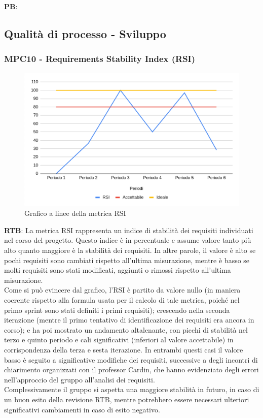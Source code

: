 \documentclass[10pt]{article}
\begin{document}
\begin{justify}
\noindent
\textbf{PB}:


\subsection{Qualità di processo - Sviluppo}
\subsubsection{MPC10 - Requirements Stability Index (RSI)}%

\begin{figure}[H]
  \centering
  \includegraphics[width=0.9\linewidth]{RSI.png}
  \caption{Grafico a linee della metrica RSI}
  \label{fig:RSIchart}
\end{figure}

\textbf{RTB}: La metrica RSI rappresenta un indice di stabilità dei requisiti individuati nel corso del progetto. Questo indice è in percentuale e assume valore tanto più alto 
quanto maggiore è la stabilità dei requisiti. In altre parole, il valore è alto se pochi requisiti sono cambiati rispetto all'ultima misurazione, mentre è basso se molti requisiti sono
stati modificati, aggiunti o rimossi rispetto all'ultima misurazione.\\
Come si può evincere dal grafico, l'RSI è partito da valore nullo (in maniera coerente rispetto alla formula usata per il calcolo di tale metrica, poiché nel primo sprint 
sono stati definiti i primi requisiti); crescendo nella seconda iterazione (mentre il primo tentativo di identificazione dei requisiti era ancora in corso); e ha poi mostrato 
un andamento altalenante, con picchi di stabilità nel terzo e quinto periodo e cali significativi (inferiori al valore accettabile) in corrispondenza della terza e sesta iterazione. In entrambi questi 
casi il valore basso è seguito a significative modifiche dei requisiti, successive a degli incontri di chiarimento organizzati con il professor Cardin, che  hanno 
evidenziato degli errori nell'approccio del gruppo all'analisi dei requisiti.\\
Complessivamente il gruppo si aspetta una maggiore stabilità in futuro, in caso di un buon esito della revisione RTB, mentre potrebbero essere necessari ulteriori
significativi cambiamenti in caso di esito negativo.\\


\end{justify}
\end{document}
